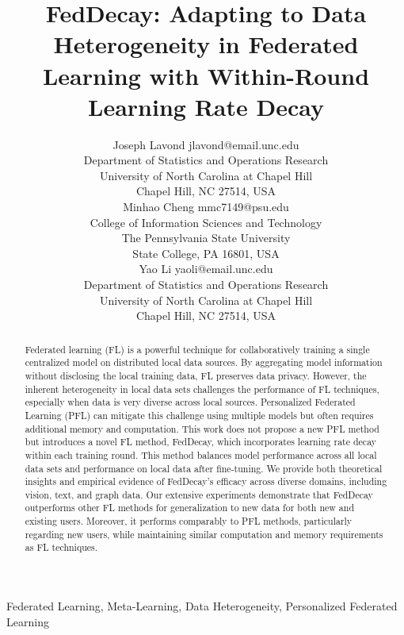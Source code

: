 \documentclass[twoside, 11pt]{article}
\begin{document}
    \title{FedDecay: Adapting to Data Heterogeneity in Federated Learning with Within-Round Learning Rate Decay}
    \author{
        \name Joseph Lavond \email jlavond@email.unc.edu \\
        \addr Department of Statistics and Operations Research \\
            University of North Carolina at Chapel Hill \\
            Chapel Hill, NC 27514, USA \\
        \AND
        \name Minhao Cheng \email mmc7149@psu.edu \\
        \addr College of Information Sciences and Technology \\
            The Pennsylvania State University \\
            State College, PA 16801, USA \\
        \AND
        \name Yao Li \email yaoli@email.unc.edu \\
        \addr Department of Statistics and Operations Research \\
            University of North Carolina at Chapel Hill \\
            Chapel Hill, NC 27514, USA \\
    }

    \maketitle
    
    \begin{abstract}%
        Federated learning (FL) is a powerful technique for collaboratively training a single centralized model on distributed local data sources. 
        By aggregating model information without disclosing the local training data, FL preserves data privacy.
        However, the inherent heterogeneity in local data sets challenges the performance of FL techniques, especially when data is very diverse across local sources.
        Personalized Federated Learning (PFL) can mitigate this challenge using multiple models but often requires additional memory and computation.
        This work does not propose a new PFL method but introduces a novel FL method, FedDecay, which incorporates learning rate decay within each training round.
        This method balances model performance across all local data sets and performance on local data after fine-tuning.
        We provide both theoretical insights and empirical evidence of FedDecay's efficacy across diverse domains, including vision, text, and graph data.
        Our extensive experiments demonstrate that FedDecay outperforms other FL methods for generalization to new data for both new and existing users.
        Moreover, it performs comparably to PFL methods, particularly regarding new users, while maintaining similar computation and memory requirements as FL techniques.
    \end{abstract}
    \begin{keywords}
        Federated Learning, Meta-Learning, Data Heterogeneity, Personalized Federated Learning
    \end{keywords}
    
\end{document}
